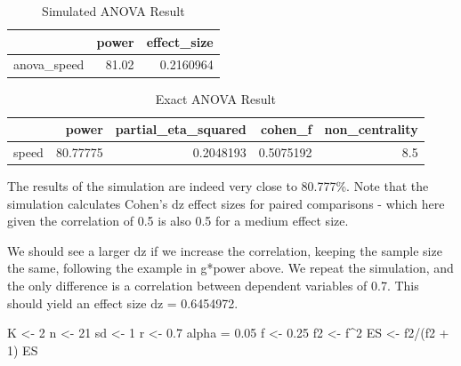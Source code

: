 \documentclass[
]{book}
\newenvironment{Shaded}{\begin{snugshade}}{\end{snugshade}}
\newcommand{\DecValTok}[1]{\textcolor[rgb]{0.00,0.00,0.81}{#1}}
\newcommand{\FloatTok}[1]{\textcolor[rgb]{0.00,0.00,0.81}{#1}}
\newcommand{\NormalTok}[1]{#1}
\newcommand{\OtherTok}[1]{\textcolor[rgb]{0.56,0.35,0.01}{#1}}
\newcommand{\SpecialCharTok}[1]{\textcolor[rgb]{0.00,0.00,0.00}{#1}}
\begin{document}
\newpage

\begin{table}[!h]

\caption{\label{tab:unnamed-chunk-90}Simulated ANOVA Result}
\centering
\begin{tabular}[t]{l|r|r}
\hline
  & power & effect\_size\\
\hline
anova\_speed & 81.02 & 0.2160964\\
\hline
\end{tabular}
\end{table}

\begin{table}[!h]

\caption{\label{tab:unnamed-chunk-92}Exact ANOVA Result}
\centering
\begin{tabular}[t]{l|r|r|r|r}
\hline
  & power & partial\_eta\_squared & cohen\_f & non\_centrality\\
\hline
speed & 80.77775 & 0.2048193 & 0.5075192 & 8.5\\
\hline
\end{tabular}
\end{table}

The results of the simulation are indeed very close to 80.777\%. Note that the simulation calculates Cohen's dz effect sizes for paired comparisons - which here given the correlation of 0.5 is also 0.5 for a medium effect size.

\newpage

We should see a larger dz if we increase the correlation, keeping the sample size the same, following the example in g*power above. We repeat the simulation, and the only difference is a correlation between dependent variables of 0.7. This should yield an effect size dz = 0.6454972.

\begin{Shaded}
\begin{Highlighting}[]
\NormalTok{K }\OtherTok{\textless{}{-}} \DecValTok{2}
\NormalTok{n }\OtherTok{\textless{}{-}} \DecValTok{21}
\NormalTok{sd }\OtherTok{\textless{}{-}} \DecValTok{1}
\NormalTok{r }\OtherTok{\textless{}{-}} \FloatTok{0.7}
\NormalTok{alpha }\OtherTok{=} \FloatTok{0.05}
\NormalTok{f }\OtherTok{\textless{}{-}} \FloatTok{0.25}
\NormalTok{f2 }\OtherTok{\textless{}{-}}\NormalTok{ f}\SpecialCharTok{\^{}}\DecValTok{2}
\NormalTok{ES }\OtherTok{\textless{}{-}}\NormalTok{ f2}\SpecialCharTok{/}\NormalTok{(f2 }\SpecialCharTok{+} \DecValTok{1}\NormalTok{)}
\NormalTok{ES}
\end{Highlighting}
\end{Shaded}
\end{document}
